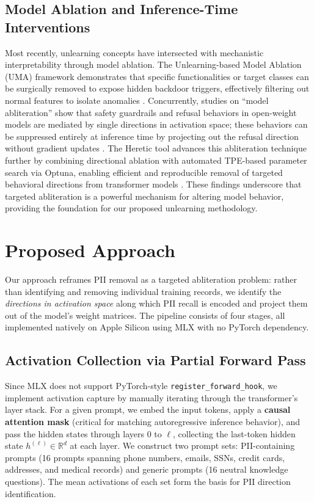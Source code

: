 \documentclass[11pt]{article}
\begin{document}
\subsection{Model Ablation and Inference-Time Interventions}

Most recently, unlearning concepts have intersected with mechanistic interpretability through model ablation. The Unlearning-based Model Ablation (UMA) framework demonstrates that specific functionalities or target classes can be surgically removed to expose hidden backdoor triggers, effectively filtering out normal features to isolate anomalies \citep{zhao2024facilitating}. Concurrently, studies on ``model abliteration'' show that safety guardrails and refusal behaviors in open-weight models are mediated by single directions in activation space; these behaviors can be suppressed entirely at inference time by projecting out the refusal direction without gradient updates \citep{labonne2024uncensor, agnihotri2025granular}. The Heretic tool \citep{heretic2025} advances this abliteration technique further by combining directional ablation with automated TPE-based parameter search via Optuna, enabling efficient and reproducible removal of targeted behavioral directions from transformer models \citep{arditi2024refusal}. These findings underscore that targeted abliteration is a powerful mechanism for altering model behavior, providing the foundation for our proposed unlearning methodology.

\section{Proposed Approach}

Our approach reframes PII removal as a targeted abliteration problem: rather than identifying and removing individual training records, we identify the \textit{directions in activation space} along which PII recall is encoded and project them out of the model's weight matrices. The pipeline consists of four stages, all implemented natively on Apple Silicon using MLX \citep{mlx2024} with no PyTorch dependency.

\subsection{Activation Collection via Partial Forward Pass}

Since MLX does not support PyTorch-style \texttt{register\_forward\_hook}, we implement activation capture by manually iterating through the transformer's layer stack. For a given prompt, we embed the input tokens, apply a \textbf{causal attention mask} (critical for matching autoregressive inference behavior), and pass the hidden states through layers $0$ to $\ell$, collecting the last-token hidden state $h^{(\ell)} \in \mathbb{R}^d$ at each layer. We construct two prompt sets: PII-containing prompts (16 prompts spanning phone numbers, emails, SSNs, credit cards, addresses, and medical records) and generic prompts (16 neutral knowledge questions). The mean activations of each set form the basis for PII direction identification.
\end{document}
